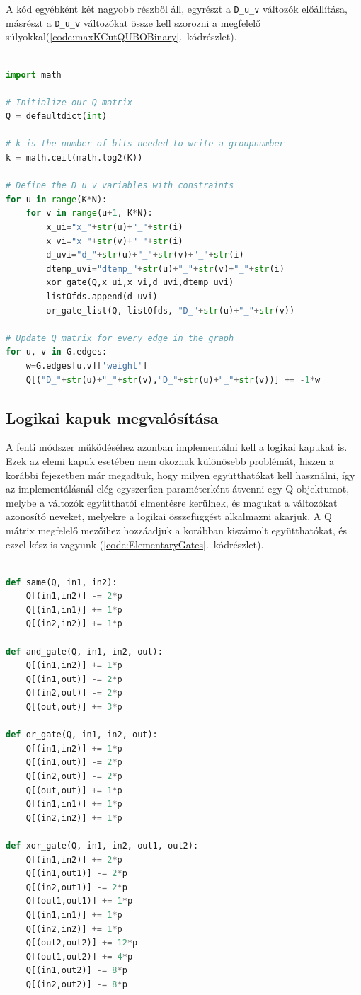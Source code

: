 A kód egyébként két nagyobb részből áll, egyrészt a \verb+D_u_v+ változók előállítása, másrészt a  \verb+D_u_v+ változókat össze kell szorozni a megfelelő súlyokkal(\ref{code:maxKCutQUBOBinary}.~kódrészlet).

\begin{lstlisting}[language=python,caption=Max-K-cut QUBO (bináris kódolás),label=code:maxKCutQUBOBinary]

import math

# Initialize our Q matrix
Q = defaultdict(int)

# k is the number of bits needed to write a groupnumber
k = math.ceil(math.log2(K))

# Define the D_u_v variables with constraints
for u in range(K*N):
	for v in range(u+1, K*N):
		x_ui="x_"+str(u)+"_"+str(i)
		x_vi="x_"+str(v)+"_"+str(i)
		d_uvi="d_"+str(u)+"_"+str(v)+"_"+str(i)
		dtemp_uvi="dtemp_"+str(u)+"_"+str(v)+"_"+str(i)
		xor_gate(Q,x_ui,x_vi,d_uvi,dtemp_uvi)
		listOfds.append(d_uvi)
		or_gate_list(Q, listOfds, "D_"+str(u)+"_"+str(v))

# Update Q matrix for every edge in the graph
for u, v in G.edges:
	w=G.edges[u,v]['weight']
	Q[("D_"+str(u)+"_"+str(v),"D_"+str(u)+"_"+str(v))] += -1*w

\end{lstlisting}

\subsection{Logikai kapuk megvalósítása}



A fenti módszer működéséhez azonban implementálni kell a logikai kapukat is.
Ezek az elemi kapuk esetében nem okoznak különösebb problémát, hiszen a korábbi fejezetben már megadtuk, hogy milyen együtthatókat kell használni, így az implementálásnál elég egyszerűen paraméterként átvenni egy Q objektumot, melybe a változók együtthatói elmentésre kerülnek, és magukat a változókat azonosító neveket, melyekre a logikai összefüggést alkalmazni akarjuk. A Q mátrix megfelelő mezőihez hozzáadjuk a korábban kiszámolt együtthatókat, és ezzel kész is vagyunk (\ref{code:ElementaryGates}.~kódrészlet).

\begin{lstlisting}[language=python,caption=Elemi kapuk,label=code:ElementaryGates]
	
def same(Q, in1, in2):
	Q[(in1,in2)] -= 2*p
	Q[(in1,in1)] += 1*p
	Q[(in2,in2)] += 1*p

def and_gate(Q, in1, in2, out):
	Q[(in1,in2)] += 1*p
	Q[(in1,out)] -= 2*p
	Q[(in2,out)] -= 2*p
	Q[(out,out)] += 3*p

def or_gate(Q, in1, in2, out):
	Q[(in1,in2)] += 1*p
	Q[(in1,out)] -= 2*p
	Q[(in2,out)] -= 2*p
	Q[(out,out)] += 1*p
	Q[(in1,in1)] += 1*p
	Q[(in2,in2)] += 1*p

def xor_gate(Q, in1, in2, out1, out2):
	Q[(in1,in2)] += 2*p
	Q[(in1,out1)] -= 2*p
	Q[(in2,out1)] -= 2*p
	Q[(out1,out1)] += 1*p
	Q[(in1,in1)] += 1*p
	Q[(in2,in2)] += 1*p
	Q[(out2,out2)] += 12*p
	Q[(out1,out2)] += 4*p
	Q[(in1,out2)] -= 8*p
	Q[(in2,out2)] -= 8*p
	
\end{lstlisting}


